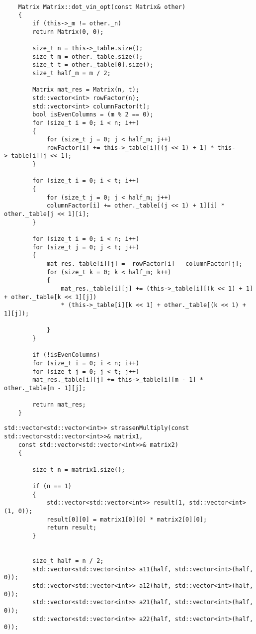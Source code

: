 \begin{appendices}
	\begin{lstlisting}[label=lst:vin_opt,caption=Реализация алгоритма расчета произведения матриц Винограда с оптимизациями]
	
	Matrix Matrix::dot_vin_opt(const Matrix& other)
	{
		if (this->_m != other._n)
		return Matrix(0, 0);
		
		size_t n = this->_table.size();
		size_t m = other._table.size();
		size_t t = other._table[0].size();
		size_t half_m = m / 2;
		
		Matrix mat_res = Matrix(n, t);
		std::vector<int> rowFactor(n);
		std::vector<int> columnFactor(t);
		bool isEvenColumns = (m % 2 == 0);
		for (size_t i = 0; i < n; i++)
		{
			for (size_t j = 0; j < half_m; j++)
			rowFactor[i] += this->_table[i][(j << 1) + 1] * this->_table[i][j << 1];
		}
		
		for (size_t i = 0; i < t; i++)
		{
			for (size_t j = 0; j < half_m; j++)
			columnFactor[i] += other._table[(j << 1) + 1][i] * other._table[j << 1][i];
		}
		
		for (size_t i = 0; i < n; i++)
		for (size_t j = 0; j < t; j++)
		{
			mat_res._table[i][j] = -rowFactor[i] - columnFactor[j];
			for (size_t k = 0; k < half_m; k++)
			{
				mat_res._table[i][j] += (this->_table[i][(k << 1) + 1] + other._table[k << 1][j])
				* (this->_table[i][k << 1] + other._table[(k << 1) + 1][j]);
				
			}
		}
		
		if (!isEvenColumns)
		for (size_t i = 0; i < n; i++)
		for (size_t j = 0; j < t; j++)
		mat_res._table[i][j] += this->_table[i][m - 1] * other._table[m - 1][j];
		
		return mat_res;
	}
	\end{lstlisting}
	
	\begin{lstlisting}[label=lst:stras,caption=Реализация алгоритма расчета произведения матриц Штрассена]
	std::vector<std::vector<int>> strassenMultiply(const std::vector<std::vector<int>>& matrix1,
	const std::vector<std::vector<int>>& matrix2)
	{
		
		size_t n = matrix1.size();
		
		if (n == 1)
		{
			std::vector<std::vector<int>> result(1, std::vector<int>(1, 0));
			result[0][0] = matrix1[0][0] * matrix2[0][0];
			return result;
		}
		
		
		size_t half = n / 2;
		std::vector<std::vector<int>> a11(half, std::vector<int>(half, 0));
		std::vector<std::vector<int>> a12(half, std::vector<int>(half, 0));
		std::vector<std::vector<int>> a21(half, std::vector<int>(half, 0));
		std::vector<std::vector<int>> a22(half, std::vector<int>(half, 0));
		

\end{lstlisting}
\end{appendices}
